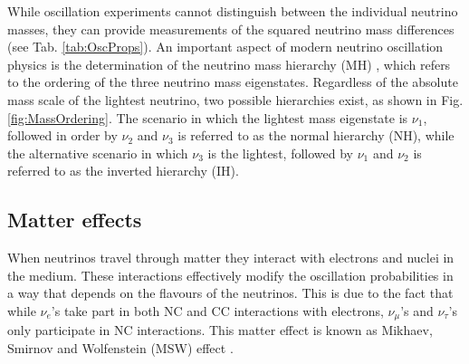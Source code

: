 While oscillation experiments cannot distinguish between the individual neutrino masses, they can provide measurements of the squared neutrino mass differences (see Tab. \ref{tab:OscProps}). An important aspect of modern neutrino oscillation physics is the determination of the neutrino mass hierarchy (MH) , which refers to the ordering of the three neutrino mass eigenstates. Regardless of the absolute mass scale of the lightest neutrino, two possible hierarchies exist, as shown in Fig. \ref{fig:MassOrdering}. The scenario in which the lightest mass eigenstate is $\nu_1$, followed in order by $\nu_2$ and $\nu_3$ is referred to as the normal hierarchy (NH), while the alternative scenario in which $\nu_3$ is the lightest, followed by $\nu_1$ and $\nu_2$ is referred to as the inverted hierarchy (IH).  
\subsection{Matter effects}
\label{Sec:MSW}

When neutrinos travel through matter they interact with electrons and nuclei in the medium. These interactions effectively modify the oscillation probabilities in a way that depends on the flavours of the neutrinos. This is due to the fact that while $\nu_e$'s take part in both NC and CC interactions with electrons, $\nu_\mu$'s and $\nu_\tau$'s only participate in NC interactions. This matter effect is known as Mikhaev, Smirnov and Wolfenstein (MSW) effect \cite{Mikheyev:1985zog,Smirnov:2003da,Wolfenstein:1977ue}. 

